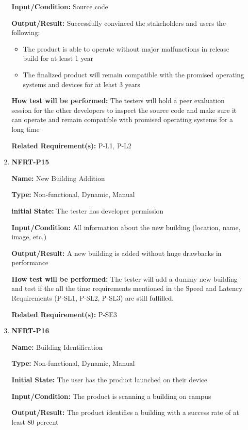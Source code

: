 \documentclass[12pt, titlepage]{article}
\begin{document}
\begin{enumerate}
\textbf{Input/Condition:} Source code

\textbf{Output/Result:} Successfully convinced the stakeholders and users the following:
\begin{itemize} 
  \item The product is able to operate without major malfunctions in release build for at least 1 year
  \item The finalized product will remain compatible with the promised operating systems and devices for at least 3 years
\end{itemize}

\textbf{How test will be performed:} The testers will hold a peer evaluation session for the other developers to inspect the source code and make sure it can operate and remain compatible with promised operating systems for a long time

\textbf{Related Requirement(s):} P-L1, P-L2

\item{\textbf{NFRT-P15}}

\textbf{Name:} New Building Addition

\textbf{Type:} Non-functional, Dynamic, Manual

\textbf{initial State:} The tester has developer permission

\textbf{Input/Condition:} All information about the new building (location, name, image, etc.)

\textbf{Output/Result:} A new building is added without huge drawbacks in performance

\textbf{How test will be performed:} The tester will add a dummy new building and test if the all the time requirements mentioned in the Speed and Latency Requirements (P-SL1, P-SL2, P-SL3) are still fulfilled.

\textbf{Related Requirement(s):} P-SE3

\item{\textbf{NFRT-P16}}

\textbf{Name:} Building Identification

\textbf{Type:} Non-functional, Dynamic, Manual
					
\textbf{Initial State:} The user has the product launched on their device

\textbf{Input/Condition:} The product is scanning a building on campus

\textbf{Output/Result:} The product identifies a building with a success rate of at least 80 percent


\end{enumerate}
\end{document}
